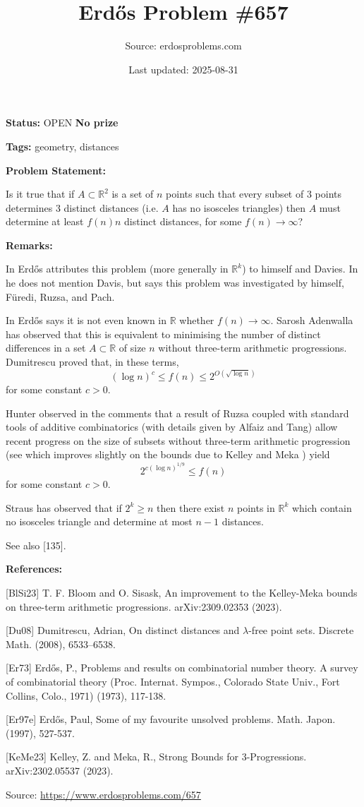 \documentclass{article}
\title{Erd\H{o}s Problem \#657}
\date{Last updated: 2025-08-31}
\author{Source: erdosproblems.com}
\begin{document}
\maketitle

\noindent\textbf{Status:} OPEN \quad \textbf{No prize}

\noindent\textbf{Tags:} geometry, distances

\medskip
\noindent\textbf{Problem Statement:}

Is it true that if $A\subset \mathbb{R}^2$ is a set of $n$ points such that every subset of $3$ points determines $3$ distinct distances (i.e. $A$ has no isosceles triangles) then $A$ must determine at least $f(n)n$ distinct distances, for some $f(n)\to \infty$?

\bigskip
\noindent\textbf{Remarks:}

In \cite{Er73} Erd\H{o}s attributes this problem (more generally in $\mathbb{R}^k$) to himself and Davies. In \cite{Er97e} he does not mention Davis, but says this problem was investigated by himself, F\"{u}redi, Ruzsa, and Pach.

In \cite{Er73} Erd\H{o}s says it is not even known in $\mathbb{R}$ whether $f(n)\to \infty$. Sarosh Adenwalla has observed that this is equivalent to minimising the number of distinct differences in a set $A\subset \mathbb{R}$ of size $n$ without three-term arithmetic progressions. Dumitrescu \cite{Du08} proved that, in these terms,\[(\log n)^c \leq f(n) \leq 2^{O(\sqrt{\log n})}\]for some constant $c>0$.

Hunter observed in the comments that a result of Ruzsa coupled with standard tools of additive combinatorics (with details given by Alfaiz and Tang) allow recent progress on the size of subsets without three-term arithmetic progression (see \cite{BlSi23} which improves slightly on the bounds due to Kelley and Meka \cite{KeMe23}) yield\[2^{c(\log n)^{1/9}}\leq f(n)\]for some constant $c>0$.

Straus has observed that if $2^k\geq n$ then there exist $n$ points in $\mathbb{R}^k$ which contain no isosceles triangle and determine at most $n-1$ distances.

See also [135].

\bigskip
\noindent\textbf{References:}

[BlSi23] T. F. Bloom and O. Sisask, An improvement to the Kelley-Meka bounds on three-term arithmetic progressions. arXiv:2309.02353 (2023).
 
 [Du08] Dumitrescu, Adrian, On distinct distances and {$\lambda$}-free point sets. Discrete Math. (2008), 6533--6538.
 
 [Er73] Erd\H{o}s, P., Problems and results on combinatorial number theory. A survey of combinatorial theory (Proc. Internat. Sympos., Colorado State Univ., Fort Collins, Colo., 1971) (1973), 117-138.
 
 [Er97e] Erd\H{o}s, Paul, Some of my favourite unsolved problems. Math. Japon. (1997), 527-537.
 
 [KeMe23] Kelley, Z. and Meka, R., Strong Bounds for 3-Progressions. arXiv:2302.05537 (2023).

\bigskip
\noindent\small{Source: \url{https://www.erdosproblems.com/657}}
\end{document}
